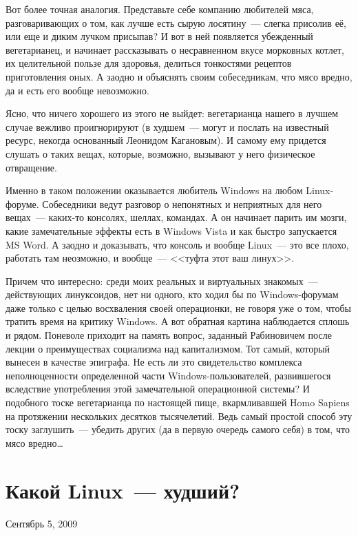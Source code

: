 Вот более точная аналогия. Представьте себе компанию любителей мяса, разговаривающих о том, как лучше есть сырую лосятину~--- слегка присолив её, или еще и диким лучком присыпав? И вот в ней появляется убежденный вегетарианец, и начинает рассказывать о несравненном вкусе морковных котлет, их целительной пользе для здоровья, делиться тонкостями рецептов приготовления оных. А заодно и объяснять своим собеседникам, что мясо вредно, да и есть его вообще невозможно.

Ясно, что ничего хорошего из этого не выйдет: вегетарианца нашего в лучшем случае вежливо проигнорируют (в худшем~--- могут и послать на известный ресурс, некогда основанный Леонидом Кагановым). И самому ему придется слушать о таких вещах, которые, возможно, вызывают у него физическое отвращение.

Именно в таком положении оказывается любитель Windows на любом Linux-форуме. Собеседники ведут разговор о непонятных и неприятных для него вещах~--- каких-то консолях, шеллах, командах. А он начинает парить им мозги, какие замечательные эффекты есть в Windows Vista и как быстро запускается MS Word. А заодно и доказывать, что консоль и вообще Linux~--- это все плохо, работать там неозможно, и вообще~--- <<туфта этот ваш линух>>.

Причем что интересно: среди моих реальных и виртуальных знакомых~--- действующих линуксоидов, нет ни одного, кто ходил бы по Windows-форумам даже только с целью восхваления своей операционки, не говоря уже о том, чтобы тратить время на критику Windows. А вот обратная картина наблюдается сплошь и рядом. Поневоле приходит на память вопрос, заданный Рабиновичем после лекции о преимуществах социализма над капитализмом. Тот самый, который вынесен в качестве эпиграфа. Не есть ли это свидетельство комплекса неполноценности определенной части Windows-пользователей, развившегося вследствие употребления этой замечательной операционной системы? И подобного тоске вегетарианца по настоящей пище, вкармливавшей Homo Sapiens на протяжении нескольких десятков тысячелетий. Ведь самый простой способ эту тоску заглушить~--- убедить других (да в первую очередь самого себя) в том, что мясо вредно\dots

\section{Какой Linux~--- худший?} 
\begin{timeline}Сентябрь 5, 2009\end{timeline}

